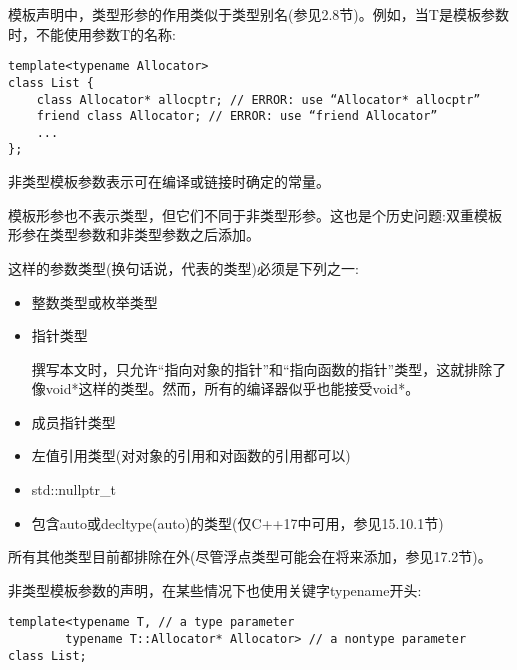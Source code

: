模板声明中，类型形参的作用类似于类型别名(参见2.8节)。例如，当T是模板参数时，不能使用参数T的名称:

\begin{lstlisting}[style=styleCXX]
template<typename Allocator>
class List {
	class Allocator* allocptr; // ERROR: use “Allocator* allocptr”
	friend class Allocator; // ERROR: use “friend Allocator”
	...
};
\end{lstlisting}


非类型模板参数表示可在编译或链接时确定的常量。

\begin{tcolorbox}[colback=webgreen!5!white,colframe=webgreen!75!black]
\hspace*{0.75cm}模板形参也不表示类型，但它们不同于非类型形参。这也是个历史问题:双重模板形参在类型参数和非类型参数之后添加。
\end{tcolorbox}

这样的参数类型(换句话说，代表的类型)必须是下列之一:

\begin{itemize}
\item 
整数类型或枚举类型

\item 
指针类型

\begin{tcolorbox}[colback=webgreen!5!white,colframe=webgreen!75!black]
\hspace*{0.75cm}撰写本文时，只允许“指向对象的指针”和“指向函数的指针”类型，这就排除了像void*这样的类型。然而，所有的编译器似乎也能接受void*。
\end{tcolorbox}

\item 
成员指针类型

\item
左值引用类型(对对象的引用和对函数的引用都可以)

\item 
std::nullptr\_t

\item 
包含auto或decltype(auto)的类型(仅C++17中可用，参见15.10.1节)
\end{itemize}

所有其他类型目前都排除在外(尽管浮点类型可能会在将来添加，参见17.2节)。

非类型模板参数的声明，在某些情况下也使用关键字typename开头:

\begin{lstlisting}[style=styleCXX]
template<typename T, // a type parameter
		typename T::Allocator* Allocator> // a nontype parameter
class List;
\end{lstlisting}

